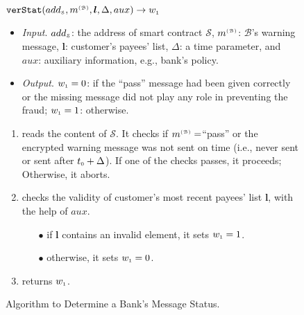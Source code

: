 %
%
 \vspace{-2.5mm}
\begin{figure}[!htbp]
\setlength{\fboxsep}{1pt}
\begin{center}
    \begin{tcolorbox}[enhanced,width=81mm, height=65.5mm, left=0mm,
    drop fuzzy shadow southwest,
    colframe=black,colback=white]
{\small{
    \vspace{-2.6mm}
\underline{$\mathtt{verStat}(add_{\scriptscriptstyle\mathcal{S}}, m^{\scriptscriptstyle\mathcal{(B)}},  \bm l, \Delta, aux)\rightarrow w_{\scriptscriptstyle 1}$}\\
%
\vspace{-2.5mm}
\begin{itemize}[leftmargin=4.2mm]
\item\noindent\textit{Input}. $add_{\scriptscriptstyle\mathcal{S}}$: the address of smart contract $\mathcal{S}$, $m^{\scriptscriptstyle\mathcal{(B)}}$:  $\mathcal{B}$'s warning message,  $\bm l$:  customer's payees' list, $\Delta$: a time parameter, and $aux$: auxiliary information, e.g., bank's policy. 
%
\item\noindent\textit{Output}. $ w_{\scriptscriptstyle 1}=0$: if the ``pass'' message had been given correctly or the missing message did not play any role in preventing the fraud; $ w_{\scriptscriptstyle 1}=1$: otherwise. 
\end{itemize}
\begin{enumerate}[leftmargin=5.2mm]
\item reads the content of   $\mathcal{S}$. It checks if $m^{\scriptscriptstyle\mathcal{(B)}}=$``pass''  or the encrypted warning message was not sent on time (i.e., never sent or sent after    $t_{\scriptscriptstyle 0}+\Delta$).  If one of the checks passes, it proceeds; Otherwise, it aborts. 
\item checks the validity of  customer's most recent payees' list $\bm l$, with the help of  $aux$. 
\begin{itemize}
\item[$\bullet$]  if $\bm l$ contains an invalid element,  it sets $ w_{\scriptscriptstyle 1}=1$.
\item [$\bullet$] otherwise, it sets $ w_{\scriptscriptstyle 1}=0$.
\end{itemize}
\item returns $ w_{\scriptscriptstyle 1}$.
\vspace{-1.4mm}
\end{enumerate}
}}
\end{tcolorbox}
\end{center}
\vspace{-3mm}
\caption{Algorithm to Determine a Bank's Message Status.} 
\label{fig:verStat}
\end{figure}




